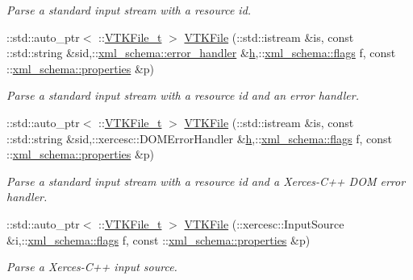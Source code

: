 \begin{DoxyCompactItemize}
\begin{DoxyCompactList}\small\item\em Parse a standard input stream with a resource id. \end{DoxyCompactList}\item 
\-::std\-::auto\-\_\-ptr$<$ \-::\hyperlink{classVTKFile__t}{V\-T\-K\-File\-\_\-t} $>$ \hyperlink{vtk-unstructured_8cpp_a9cf7007e58e8eefb16d14eab5ee97b36}{V\-T\-K\-File} (\-::std\-::istream \&is, const \-::std\-::string \&sid,\-::\hyperlink{namespacexml__schema_a0a5d9528e9175cedf199984a8bb64d62}{xml\-\_\-schema\-::error\-\_\-handler} \&\hyperlink{MolSim_8cpp_aa6e8e201edf24007dc075bfef6e8210c}{h},\-::\hyperlink{namespacexml__schema_a0612287d030cb2732d31a45b258fdc87}{xml\-\_\-schema\-::flags} f, const \-::\hyperlink{namespacexml__schema_a1a8ebac679580b41baebd62c7d641c1d}{xml\-\_\-schema\-::properties} \&p)
\begin{DoxyCompactList}\small\item\em Parse a standard input stream with a resource id and an error handler. \end{DoxyCompactList}\item 
\-::std\-::auto\-\_\-ptr$<$ \-::\hyperlink{classVTKFile__t}{V\-T\-K\-File\-\_\-t} $>$ \hyperlink{vtk-unstructured_8cpp_a814cb20ccb515a7b632f0c321294e689}{V\-T\-K\-File} (\-::std\-::istream \&is, const \-::std\-::string \&sid,\-::xercesc\-::\-D\-O\-M\-Error\-Handler \&\hyperlink{MolSim_8cpp_aa6e8e201edf24007dc075bfef6e8210c}{h},\-::\hyperlink{namespacexml__schema_a0612287d030cb2732d31a45b258fdc87}{xml\-\_\-schema\-::flags} f, const \-::\hyperlink{namespacexml__schema_a1a8ebac679580b41baebd62c7d641c1d}{xml\-\_\-schema\-::properties} \&p)
\begin{DoxyCompactList}\small\item\em Parse a standard input stream with a resource id and a Xerces-\/\-C++ D\-O\-M error handler. \end{DoxyCompactList}\item 
\-::std\-::auto\-\_\-ptr$<$ \-::\hyperlink{classVTKFile__t}{V\-T\-K\-File\-\_\-t} $>$ \hyperlink{vtk-unstructured_8cpp_a5fced37b23830aa750d1b8d2c961ddd4}{V\-T\-K\-File} (\-::xercesc\-::\-Input\-Source \&i,\-::\hyperlink{namespacexml__schema_a0612287d030cb2732d31a45b258fdc87}{xml\-\_\-schema\-::flags} f, const \-::\hyperlink{namespacexml__schema_a1a8ebac679580b41baebd62c7d641c1d}{xml\-\_\-schema\-::properties} \&p)
\begin{DoxyCompactList}\small\item\em Parse a Xerces-\/\-C++ input source. \end{DoxyCompactList}\item 

\end{DoxyCompactItemize}
